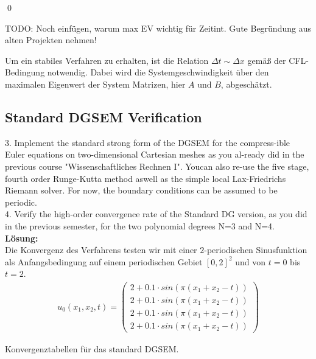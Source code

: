 \documentclass[11pt]{scrartcl}
\begin{document}
\qed

TODO: Noch einfügen, warum max EV wichtig für Zeitint. Gute Begründung aus alten Projekten nehmen!

Um ein stabiles Verfahren zu erhalten, ist die Relation $\Delta t \sim \Delta x $ gemäß der CFL-Bedingung notwendig. Dabei wird die Systemgeschwindigkeit über den maximalen Eigenwert der System Matrizen, hier $A$ und $B$, abgeschätzt. 

\subsection{Standard DGSEM Verification}
3. Implement the standard strong form of the DGSEM for the compress-ible Euler equations on two-dimensional Cartesian meshes as you al-ready did in the previous course "Wissenschaftliches Rechnen I". Youcan also re-use the five stage, fourth order Runge-Kutta method aswell as the simple local Lax-Friedrichs Riemann solver. For now, the boundary conditions can be assumed to be periodic. \\
4. Verify the high-order convergence rate of the Standard DG version, as you did in the previous semester, for the two polynomial degrees N=3 and N=4. \\
\newline
\textbf{Lösung:} \\
Die Konvergenz des Verfahrens testen wir mit einer $2$-periodischen Sinusfunktion als Anfangsbedingung auf einem periodischen Gebiet $[0, 2]^2$ und von $t=0$ bis $t=2$.
\begin{align}
u_0(x_1, x_2, t) = 
\begin{pmatrix}
2 + 0.1 \cdot sin( \pi (x_1 + x_2 - t)) \\
2 + 0.1 \cdot sin( \pi (x_1 + x_2 - t)) \\
2 + 0.1 \cdot sin( \pi (x_1 + x_2 - t)) \\
2 + 0.1 \cdot sin( \pi (x_1 + x_2 - t))
\end{pmatrix}
\label{Anfangsbedingung Konvergenz}
\end{align}

Konvergenztabellen für das standard DGSEM.
\end{document}
